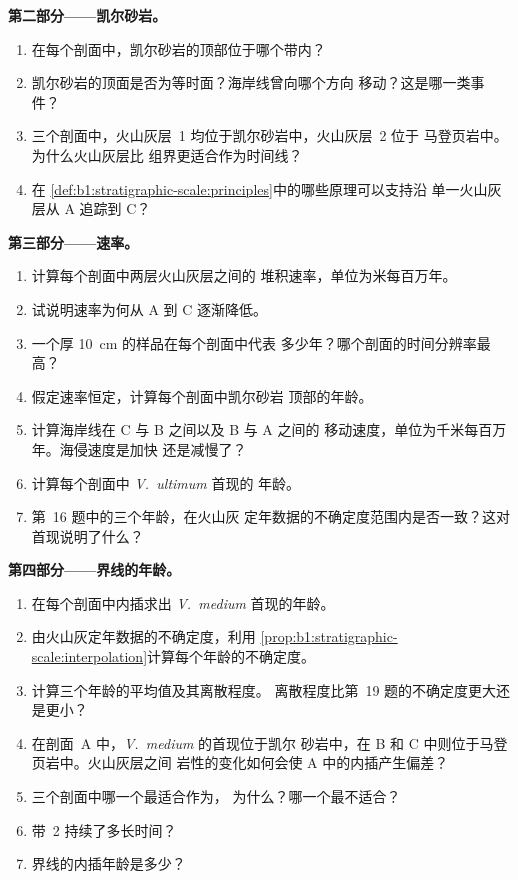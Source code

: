 \begin{problem}
\noindent\textbf{第二部分——凯尔砂岩。}
\begin{enumerate}[resume]
  \item 在每个剖面中，凯尔砂岩的顶部位于哪个带内？
  \item 凯尔砂岩的顶面是否为等时面？海岸线曾向哪个方向
        移动？这是哪一类事件？
  \item 三个剖面中，火山灰层~1 均位于凯尔砂岩中，火山灰层~2 位于
        马登页岩中。为什么火山灰层比
        组界更适合作为时间线？
  \item 在
        \cref{def:b1:stratigraphic-scale:principles}中的哪些原理可以支持沿
        单一火山灰层从 A 追踪到 C？
\end{enumerate}

\noindent\textbf{第三部分——速率。}
\begin{enumerate}[resume]
  \item 计算每个剖面中两层火山灰层之间的
        堆积速率，单位为米每百万年。
  \item 试说明速率为何从 A 到 C 逐渐降低。
  \item 一个厚 \qty{10}{cm} 的样品在每个剖面中代表
        多少年？哪个剖面的时间分辨率最高？
  \item 假定速率恒定，计算每个剖面中凯尔砂岩
        顶部的年龄。
  \item 计算海岸线在 C 与 B 之间以及 B 与 A 之间的
        移动速度，单位为千米每百万年。海侵速度是加快
        还是减慢了？
  \item 计算每个剖面中 \emph{V.~ultimum} 首现的
        年龄。
  \item 第~16 题中的三个年龄，在火山灰
        定年数据的不确定度范围内是否一致？这对首现说明了什么？
\end{enumerate}

\noindent\textbf{第四部分——界线的年龄。}
\begin{enumerate}[resume]
  \item 在每个剖面中内插求出
        \emph{V.~medium} 首现的年龄。
  \item 由火山灰定年数据的不确定度，利用
        \cref{prop:b1:stratigraphic-scale:interpolation}计算每个年龄的不确定度。
  \item 计算三个年龄的平均值及其离散程度。
        离散程度比第~19 题的不确定度更大还是更小？
  \item 在剖面~A 中，\emph{V.~medium} 的首现位于凯尔
        砂岩中，在 B 和 C 中则位于马登页岩中。火山灰层之间
        岩性的变化如何会使 A 中的内插产生偏差？
  \item 三个剖面中哪一个最适合作为，
        为什么？哪一个最不适合？
  \item 带~2 持续了多长时间？
  \item 界线的内插年龄是多少？
\end{enumerate}
\end{problem}
